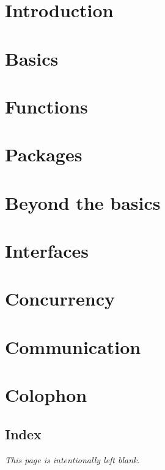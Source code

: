 \documentclass[a4paper,twoside,openleft]{blocksbook}
\begin{document}
\chapter{Introduction}
\label{chap:intro}


\chapter{Basics}
\label{chap:basics}


\chapter{Functions}
\label{chap:functions}


\chapter{Packages}
\label{chap:packages}


\chapter{Beyond the basics}
\label{chap:beyond}


\chapter{Interfaces}
\label{chap:interfaces}


\chapter{Concurrency}
\label{chap:channels}


\chapter{Communication}
\label{chap:communication}



\appendix

\chapter{Colophon}


\begin{twocolumn}
\chapter{Index}
\printindex
\end{twocolumn}
\begin{onecolumn}



\newpage
\thispagestyle{empty}
\begin{center}
\emph{This page is intentionally left blank.}
\end{center}
\end{onecolumn}
\end{document}
